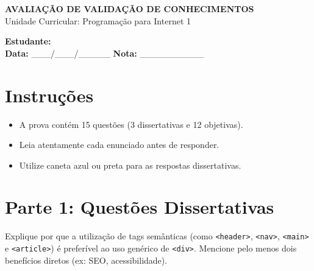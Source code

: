 \documentclass[12pt,a4paper]{article}
\newcommand{\checkGabarito}[1]{\iftoggle{gabarito}{\hspace{0.5cm} \textbf{\color{corGabarito}--- #1}}{}}
\begin{document}
\begin{center}
    {\Large \textbf{AVALIAÇÃO DE VALIDAÇÃO DE CONHECIMENTOS}}\\
    \vspace{0.2cm}
    Unidade Curricular: Programação para Internet 1\\
    \iftoggle{gabarito}{\textbf{\color{corGabarito}CHAVE DE RESPOSTAS / GABARITO}}{}
\end{center}

\vspace{0.5cm}

\begin{tcolorbox}[colback=white, colframe=black, boxrule=0.5pt, arc=0pt]
    \textbf{Estudante:} \hrulefill \\
    \vspace{0.3cm}
    \textbf{Data:} \_\_\_/\_\_\_/\_\_\_\_\_ \hspace{2cm} \textbf{Nota:} \_\_\_\_\_\_\_\_\_\_
\end{tcolorbox}

\vspace{0.5cm}

\section*{Instruções}
\begin{itemize}
    \item A prova contém 15 questões (3 dissertativas e 12 objetivas).
    \item Leia atentamente cada enunciado antes de responder.
    \item Utilize caneta azul ou preta para as respostas dissertativas.
\end{itemize}

\vspace{0.5cm}

\section*{Parte 1: Questões Dissertativas}

\begin{tcolorbox}[colback=azulTitulo!5, colframe=azulTitulo, title=Questão 1: HTML5 Semântico e Estrutura]
    Explique por que a utilização de tags semânticas (como \texttt{<header>}, \texttt{<nav>}, \texttt{<main>} e \texttt{<article>}) é preferível ao uso genérico de \texttt{<div>}. Mencione pelo menos dois benefícios diretos (ex: SEO, acessibilidade).
    \vspace{4cm}
    \checkGabarito{Resposta esperada: Melhora o SEO (motores de busca entendem a estrutura), aumenta a acessibilidade (leitores de tela navegam melhor) e facilita a manutenção do código.}
\end{tcolorbox}
\end{document}
